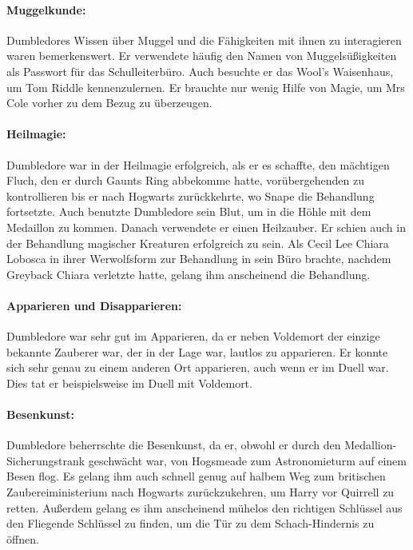 \documentclass[a4paper, 10pt]{article}
\begin{document}
\paragraph{Muggelkunde:}
Dumbledores Wissen über Muggel und die Fähigkeiten mit ihnen zu interagieren waren bemerkenswert. Er verwendete häufig den Namen von Muggelsüßigkeiten als Passwort für das Schulleiterbüro. Auch besuchte er das Wool's Waisenhaus, um Tom Riddle kennenzulernen. Er brauchte nur wenig Hilfe von Magie, um Mrs Cole vorher zu dem Bezug zu überzeugen.
\paragraph{Heilmagie:}
Dumbledore war in der Heilmagie erfolgreich, als er es schaffte, den mächtigen Fluch, den er durch Gaunts Ring abbekomme hatte, vorübergehenden zu kontrollieren bis er nach Hogwarts zurückkehrte, wo Snape die Behandlung fortsetzte. Auch benutzte Dumbledore sein Blut, um in die Höhle mit dem Medaillon zu kommen. Danach verwendete er einen Heilzauber. Er schien auch in der Behandlung magischer Kreaturen erfolgreich zu sein. Als Cecil Lee Chiara Lobosca in ihrer Werwolfsform zur Behandlung in sein Büro brachte, nachdem Greyback Chiara verletzte hatte, gelang ihm anscheinend die Behandlung.
\paragraph{Apparieren und Disapparieren:}
Dumbledore war sehr gut im Apparieren, da er neben Voldemort der einzige bekannte Zauberer war, der in der Lage war, lautlos zu apparieren. Er konnte sich sehr genau zu einem anderen Ort apparieren, auch wenn er im Duell war. Dies tat er beispielsweise im Duell mit Voldemort.
\paragraph{Besenkunst:}
Dumbledore beherrschte die Besenkunst, da er, obwohl er durch den Medallion-Sicherungstrank geschwächt war, von Hogsmeade zum Astronomieturm auf einem Besen flog. Es gelang ihm auch schnell genug auf halbem Weg zum britischen Zaubereiministerium nach Hogwarts zurückzukehren, um Harry vor Quirrell zu retten. Außerdem gelang es ihm anscheinend mühelos den richtigen Schlüssel aus den Fliegende Schlüssel zu finden, um die Tür zu dem Schach-Hindernis zu öffnen.
\end{document}
